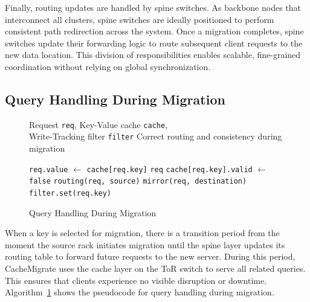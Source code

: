 \documentclass[conference]{IEEEtran}
\begin{document}
Finally, routing updates are handled by spine switches. As backbone nodes that interconnect all clusters, spine switches are ideally positioned to perform consistent path redirection across the system. Once a migration completes, spine switches update their forwarding logic to route subsequent client requests to the new data location. This division of responsibilities enables scalable, fine-grained coordination without relying on global synchronization.


\subsection{Query Handling During Migration}
\label{subsec:QueryHandling}

\begin{figure}[!t]
    \renewcommand{\algorithmicrequire}{\textbf{Input:}}
    \renewcommand{\algorithmicensure}{\textbf{Output:}}
    \begin{algorithm}[H]
        \caption{Query Handling During Migration}
        \label{alg:query_handling}
        \begin{algorithmic}[1]
            \REQUIRE Request \texttt{req}, Key-Value cache \texttt{cache},  \\Write-Tracking filter \texttt{filter}
            \ENSURE Correct routing and consistency during migration

            \STATE \texttt{req.value} $\leftarrow$ \texttt{cache[req.key]}
            \RETURN \texttt{req}
            \STATE \texttt{cache[req.key].valid} $\leftarrow$ \texttt{false}
            \STATE \texttt{routing(req, source)}
            \STATE \texttt{mirror(req, destination)}
            \STATE \texttt{filter.set(req.key)}
            \ENDIF
            \ENDIF
        \end{algorithmic}
    \end{algorithm}
\end{figure}

When a key is selected for migration, there is a transition period from the moment the source rack initiates migration until the spine layer updates its routing table to forward future requests to the new server. During this period, CacheMigrate uses the cache layer on the ToR switch to serve all related queries. This ensures that clients experience no visible disruption or downtime. Algorithm~\ref{alg:query_handling} shows the pseudocode for query handling during migration.
\end{document}
